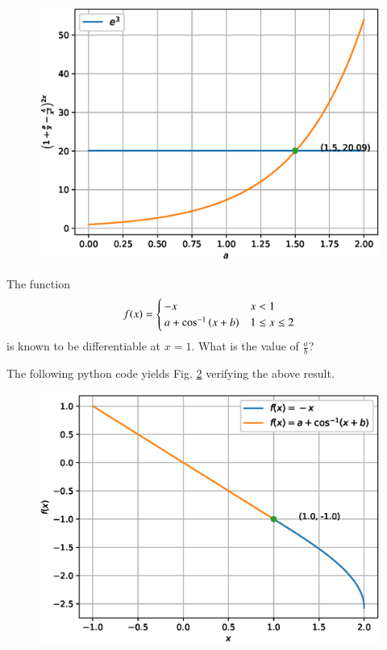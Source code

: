 \documentclass[journal,12pt,twocolumn]{IEEEtran}
\begin{document}
\begin{figure}[!ht]
\begin{center}
\includegraphics[width=\columnwidth]{./figs/ee16b1004}
\end{center}
\label{fig_4}	
\end{figure}
\begin{problem}
The function
%
\begin{equation}
f(x)=
\begin{cases}
-x & x < 1 \\
a + \cos^{-1}\left(x + b\right) & 1 \leq x \leq 2
\end{cases}
\end{equation}
%
is known to be differentiable at $x=1$.  What is the value of $\frac{a}{b}$?
\end{problem}
\solution

The following python code yields Fig. \ref{fig_5} verifying the above result.

\begin{figure}[!ht]
\begin{center}
\includegraphics[width=\columnwidth]{./figs/ee16b1005}
\end{center}
\label{fig_5}	
\end{figure}
\end{document}
